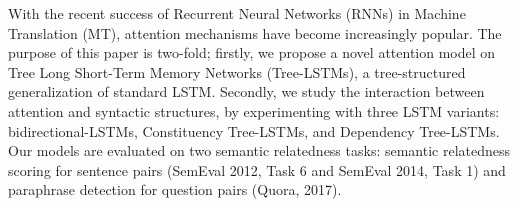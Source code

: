 With the recent success of Recurrent Neural Networks (RNNs) in Machine Translation (MT), attention mechanisms have become increasingly popular. The purpose of this paper is two-fold; firstly, we propose a novel attention model on Tree Long Short-Term Memory Networks (Tree-LSTMs), a tree-structured generalization of standard LSTM. Secondly, we study the interaction between attention and syntactic structures, by experimenting with three LSTM variants: bidirectional-LSTMs, Constituency Tree-LSTMs, and Dependency Tree-LSTMs. Our models are evaluated on two semantic relatedness tasks: semantic relatedness scoring for sentence pairs (SemEval 2012, Task 6 and SemEval 2014, Task 1) and paraphrase detection for question pairs (Quora, 2017).
